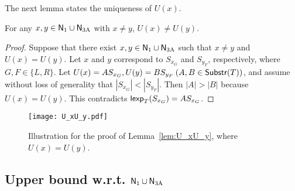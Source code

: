   The next lemma states the uniqueness of $U(x)$.
  \begin{lemma} \label{lem:U_xU_y}
    For any $x,y\in \mathsf{N}_{\mathrm{1}} \cup \mathsf{N}_{\mathrm{3A}}$ with $x \neq y$, $U(x) \neq U(y)$.
  \end{lemma}

  \begin{proof}
    Suppose that there exist $x,y\in \mathsf{N}_{\mathrm{1}} \cup \mathsf{N}_{\mathrm{3A}}$ such that
    $x \neq y$ and $U(x) = U(y)$.
    Let $x$ and $y$ correspond to $S_{x_{G}}$ and $S_{y_{F}}$, respectively,
    where $G,F \in \{L,R\}$.
    Let $U(x)=AS_{x_{G}},U(y)=BS_{y_{F}} \:(A,B\in \mathsf{Substr}(T))$,
    and assume without loss of generality that $|S_{x_{G}}|<|S_{y_{F}}|$.
    Then $|A|>|B|$ because $U(x) = U(y)$.
    This contradicts $\mathsf{lexp}_T({S_{x_{G}}})=AS_{x_{G}}$.
  \end{proof}

  \begin{figure}[H]
    \centering
    \texttt{[image: U\_xU\_y.pdf]}
    \caption{Illustration for the proof of Lemma~\ref{lem:U_xU_y}, where $U(x) = U(y)$.}
    \label{fig:U_xU_y}
  \end{figure}

  \begin{comment}
  \subsection{Case that $x\in \None \cup \Nnotv$ does not contain the edit position}

  From now on, in this subsection, we consider the case that $x\in \None \cup \Nnotv$ does not contain the edit position.
  
  \begin{lemma}
    \label{lem:eps1}
    The number of $x\in \None \cup \Nnotv$ that does not contain the edit position is 1.
  \end{lemma}

  \begin{proof}
    It can be proved by making the same arguments as for Lemma~\ref{lem:sp123} and Lemma~\ref{lem:sp45}.
  \end{proof}%
  \end{comment}

  \subsection{Upper bound w.r.t. $\mathsf{N}_{\mathrm{1}} \cup \mathsf{N}_{\mathrm{3A}}$}

